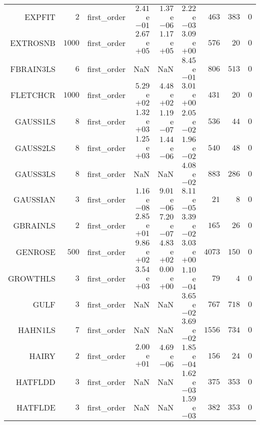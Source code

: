 \begin{longtable}{rrrrrrrrr}
EXPFIT & \(     2\) & first\_order & \( 2.41\)e\(-01\) & \( 1.37\)e\(-06\) & \( 2.22\)e\(-03\) & \(   463\) & \(   383\) & \(     0\) \\
EXTROSNB & \(  1000\) & first\_order & \( 2.67\)e\(+05\) & \( 1.17\)e\(+05\) & \( 3.09\)e\(+00\) & \(   576\) & \(    20\) & \(     0\) \\
FBRAIN3LS & \(     6\) & first\_order &       NaN &       NaN & \( 8.45\)e\(-01\) & \(   806\) & \(   513\) & \(     0\) \\
FLETCHCR & \(  1000\) & first\_order & \( 5.29\)e\(+02\) & \( 4.48\)e\(+02\) & \( 3.01\)e\(+00\) & \(   431\) & \(    20\) & \(     0\) \\
GAUSS1LS & \(     8\) & first\_order & \( 1.32\)e\(+03\) & \( 1.19\)e\(-07\) & \( 2.05\)e\(-02\) & \(   536\) & \(    44\) & \(     0\) \\
GAUSS2LS & \(     8\) & first\_order & \( 1.25\)e\(+03\) & \( 1.44\)e\(-06\) & \( 1.96\)e\(-02\) & \(   540\) & \(    48\) & \(     0\) \\
GAUSS3LS & \(     8\) & first\_order &       NaN &       NaN & \( 4.08\)e\(-02\) & \(   883\) & \(   286\) & \(     0\) \\
GAUSSIAN & \(     3\) & first\_order & \( 1.16\)e\(-08\) & \( 9.01\)e\(-06\) & \( 8.11\)e\(-05\) & \(    21\) & \(     8\) & \(     0\) \\
GBRAINLS & \(     2\) & first\_order & \( 2.85\)e\(+01\) & \( 7.20\)e\(-07\) & \( 3.39\)e\(-02\) & \(   165\) & \(    26\) & \(     0\) \\
GENROSE & \(   500\) & first\_order & \( 9.86\)e\(+02\) & \( 4.83\)e\(+02\) & \( 3.03\)e\(+00\) & \(  4073\) & \(   150\) & \(     0\) \\
GROWTHLS & \(     3\) & first\_order & \( 3.54\)e\(+03\) & \( 0.00\)e\(+00\) & \( 1.10\)e\(-04\) & \(    79\) & \(     4\) & \(     0\) \\
GULF & \(     3\) & first\_order &       NaN &       NaN & \( 3.65\)e\(-02\) & \(   767\) & \(   718\) & \(     0\) \\
HAHN1LS & \(     7\) & first\_order &       NaN &       NaN & \( 3.69\)e\(-02\) & \(  1556\) & \(   734\) & \(     0\) \\
HAIRY & \(     2\) & first\_order & \( 2.00\)e\(+01\) & \( 4.69\)e\(-06\) & \( 1.85\)e\(-04\) & \(   156\) & \(    24\) & \(     0\) \\
HATFLDD & \(     3\) & first\_order &       NaN &       NaN & \( 1.62\)e\(-03\) & \(   375\) & \(   353\) & \(     0\) \\
HATFLDE & \(     3\) & first\_order &       NaN &       NaN & \( 1.59\)e\(-03\) & \(   382\) & \(   353\) & \(     0\) \\

\end{longtable}

